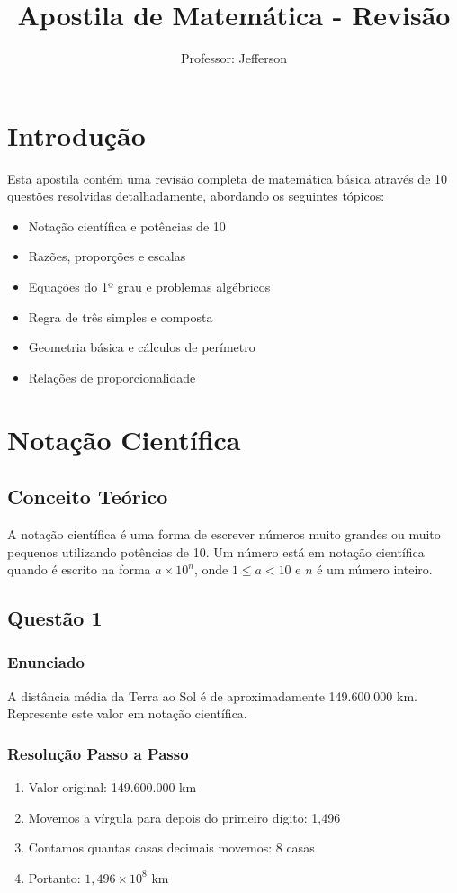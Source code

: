 \documentclass[11pt]{article}
\title{\textcolor{titleblue}{Apostila de Matemática - Revisão}}
\author{Professor: Jefferson}
\date{}
\begin{document}
\maketitle

\tableofcontents

\section{Introdução}
Esta apostila contém uma revisão completa de matemática básica através de 10 questões resolvidas detalhadamente, abordando os seguintes tópicos:

\begin{itemize}
\item Notação científica e potências de 10
\item Razões, proporções e escalas
\item Equações do 1º grau e problemas algébricos
\item Regra de três simples e composta
\item Geometria básica e cálculos de perímetro
\item Relações de proporcionalidade
\end{itemize}

\section{Notação Científica}

\subsection{Conceito Teórico}
A notação científica é uma forma de escrever números muito grandes ou muito pequenos utilizando potências de 10. Um número está em notação científica quando é escrito na forma $a \times 10^n$, onde $1 \leq a < 10$ e $n$ é um número inteiro.

\subsection{Questão 1}
\subsubsection*{Enunciado}
A distância média da Terra ao Sol é de aproximadamente 149.600.000 km. Represente este valor em notação científica.

\subsubsection*{Resolução Passo a Passo}
\begin{enumerate}
\item Valor original: 149.600.000 km
\item Movemos a vírgula para depois do primeiro dígito: 1,496
\item Contamos quantas casas decimais movemos: 8 casas
\item Portanto: $1,496 \times 10^8$ km
\end{enumerate}
\end{document}
